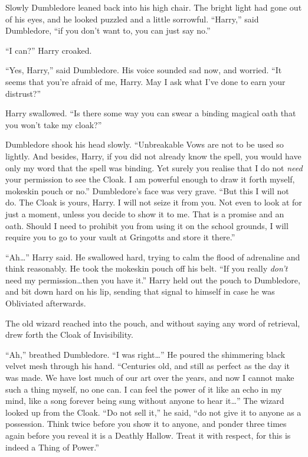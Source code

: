 Slowly Dumbledore leaned back into his high chair. The bright light had gone out of his eyes, and he looked puzzled and a little sorrowful. “Harry,” said Dumbledore, “if you don’t want to, you can just say no.”

“I can?” Harry croaked.

“Yes, Harry,” said Dumbledore. His voice sounded sad now, and worried. “It seems that you’re afraid of me, Harry. May I ask what I’ve done to earn your distrust?”

Harry swallowed. “Is there some way you can swear a binding magical oath that you won’t take my cloak?”

Dumbledore shook his head slowly. “Unbreakable Vows are not to be used so lightly. And besides, Harry, if you did not already know the spell, you would have only my word that the spell was binding. Yet surely you realise that I do not \emph{need} your permission to see the Cloak. I am powerful enough to draw it forth myself, mokeskin pouch or no.” Dumbledore’s face was very grave. “But this I will not do. The Cloak is yours, Harry. I will not seize it from you. Not even to look at for just a moment, unless you decide to show it to me. That is a promise and an oath. Should I need to prohibit you from using it on the school grounds, I will require you to go to your vault at Gringotts and store it there.”

“Ah…” Harry said. He swallowed hard, trying to calm the flood of adrenaline and think reasonably. He took the mokeskin pouch off his belt. “If you really \emph{don’t} need my permission…then you have it.” Harry held out the pouch to Dumbledore, and bit down hard on his lip, sending that signal to himself in case he was Obliviated afterwards.

The old wizard reached into the pouch, and without saying any word of retrieval, drew forth the Cloak of Invisibility.

“Ah,” breathed Dumbledore. “I was right…” He poured the shimmering black velvet mesh through his hand. “Centuries old, and still as perfect as the day it was made. We have lost much of our art over the years, and now I cannot make such a thing myself, no one can. I can feel the power of it like an echo in my mind, like a song forever being sung without anyone to hear it…” The wizard looked up from the Cloak. “Do not sell it,” he said, “do not give it to anyone as a possession. Think twice before you show it to anyone, and ponder three times again before you reveal it is a Deathly Hallow. Treat it with respect, for this is indeed a Thing of Power.”

